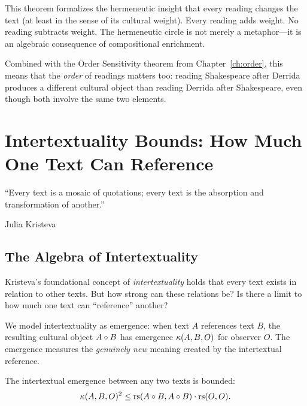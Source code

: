 \begin{interpretation}
This theorem formalizes the hermeneutic insight that every reading
changes the text (at least in the sense of its cultural weight).
Every reading adds weight.  No reading subtracts weight.  The
hermeneutic circle is not merely a metaphor---it is an algebraic
consequence of compositional enrichment.

Combined with the Order Sensitivity theorem from Chapter~\ref{ch:order},
this means that the \emph{order} of readings matters too: reading
Shakespeare after Derrida produces a different cultural object than
reading Derrida after Shakespeare, even though both involve the same
two elements.
\end{interpretation}



\chapter{Intertextuality Bounds: How Much One Text Can Reference}
\label{ch:intertextuality}

\epigraph{``Every text is a mosaic of quotations; every text is the
absorption and transformation of another.''}{Julia Kristeva}

\section{The Algebra of Intertextuality}

Kristeva's foundational concept of \emph{intertextuality} holds that
every text exists in relation to other texts.  But how strong can
these relations be?  Is there a limit to how much one text can
``reference'' another?

We model intertextuality as emergence: when text $A$ references text $B$,
the resulting cultural object $A \circ B$ has emergence
$\kappa(A, B, O)$ for observer $O$.  The emergence measures the
\emph{genuinely new} meaning created by the intertextual reference.

\begin{theorem}
\label{thm:intertextuality-bound}
The intertextual emergence between any two texts is bounded:
\[
  \kappa(A, B, O)^2 \leq
  \mathrm{rs}(A \circ B, A \circ B) \cdot \mathrm{rs}(O, O).
\]
\end{theorem}


